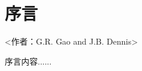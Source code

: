 \chapter*{序\quad 言} %

<作者：G.R. Gao and J.B. Dennis>

\begin{flushleft}  %
\setlength{\parindent}{2em} %

序言内容......

\end{flushleft}
